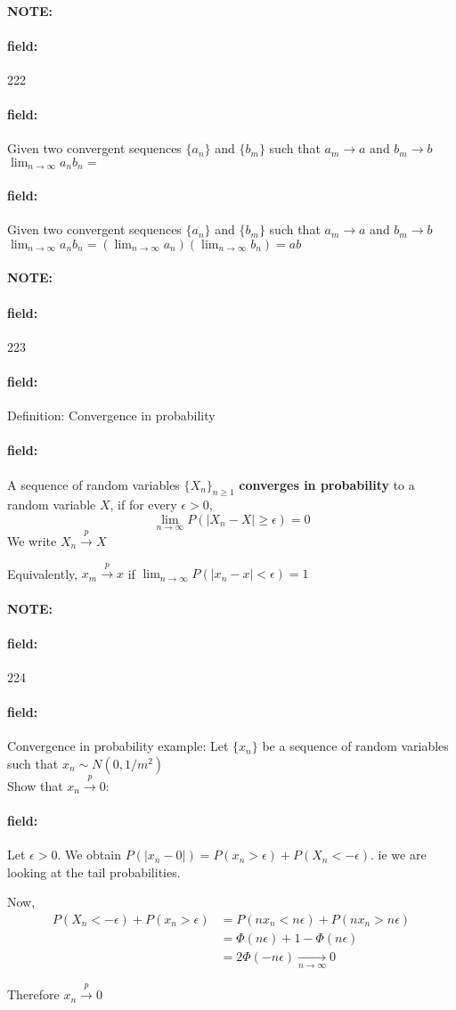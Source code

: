 \documentclass[12pt]{article}
\newenvironment{note}{\paragraph{NOTE:}}{}
\newenvironment{field}{\paragraph{field:}}{}
\begin{document}
\begin{note} \begin{field} \tiny 222 \end{field}
  \begin{field}
    Given two convergent sequences $\{a_n\}$ and $\{b_m\}$ such that $a_m \to a$ and $b_m \to b$\\
    $\lim_{n \to \infty} a_nb_n = $
  \end{field}
  \begin{field}
    Given two convergent sequences $\{a_n\}$ and $\{b_m\}$ such that $a_m \to a$ and $b_m \to b$\\
    $\lim_{n \to \infty} a_nb_n = (\lim_{n \to \infty}a_n)(\lim_{n \to \infty}b_n) = ab$
  \end{field}
\end{note}


\begin{note} \begin{field} \tiny 223 \end{field}
  \begin{field}
    Definition: Convergence in probability
  \end{field}
  \begin{field}
    A sequence of random variables $\{X_n\}_{n \geq 1}$ \textbf{converges in probability } to a random variable $X$, if for every $\epsilon > 0$, $$\lim_{n \to \infty}P(|X_n - X| \geq \epsilon) = 0 $$
    We write $X_n \overset{p}{\to} X$

    Equivalently, $x_m \overset{p}{\to} x$ if $\lim_{n \to \infty}P(|x_n - x| < \epsilon) = 1$
  \end{field}
\end{note}

\begin{note} \begin{field} \tiny 224 \end{field}
  \begin{field}
    Convergence in probability example:
    Let $\{x_n\}$ be a sequence of random variables such that $x_n \sim N(0,1/m^2)$\\
    Show that $x_n \overset{p}{\to} 0$:
  \end{field}
  \begin{field}
    Let $\epsilon > 0$. We obtain $P(|x_n - 0|) = P(x_n > \epsilon) + P(X_n < -\epsilon )$. ie we are looking at the tail probabilities.

    Now,
    \begin{align*}
      P(X_n < -\epsilon) + P(x_n > \epsilon) &=
      P(nx_n < n\epsilon) + P(nx_n > n\epsilon)\\
      &= \Phi(n\epsilon) + 1 - \Phi(n \epsilon)\\
      &= 2\Phi(-n\epsilon) \underset{n\to \infty}{\to}  0
    \end{align*}

    Therefore $x_n \overset{p}{\to} 0$
  \end{field}
\end{note}
\end{document}

